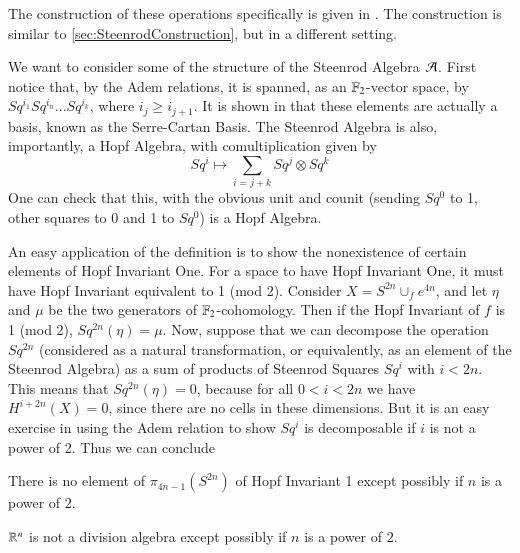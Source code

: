 The construction of these operations specifically is given in \cite[Ch~2]{MosherTengora}.  
The construction is similar to \ref{sec:SteenrodConstruction}, but in a different setting.  

We want to consider some of the structure of the Steenrod Algebra $\mathcal{A}$.  
First notice that, by the Adem relations, it is spanned, as an $\mathbb{F}_2$-vector space, by $Sq^{i_1}Sq^{i_n}...Sq^{i_k}$, where $i_j\ge i_{j+1}$.  
It is shown in \cite[Ch~6]{MosherTengora} that these elements are actually a basis, known as the Serre-Cartan Basis.  
The Steenrod Algebra is also, importantly, a Hopf Algebra, with comultiplication given by
\[Sq^i\mapsto \sum_{i=j+k} Sq^j\otimes Sq^k\]
One can check that this, with the obvious unit and counit (sending $Sq^0$ to 1, other squares to 0 and 1 to $Sq^0$) is a Hopf Algebra.  

An easy application of the definition is to show the nonexistence of certain elements of Hopf Invariant One.
For a space to have Hopf Invariant One, it must have Hopf Invariant equivalent to 1 (mod 2).  
Consider $X=S^{2n}\cup_f e^{4n}$, and let $\eta$ and $\mu$ be the two generators of $\mathbb{F}_2$-cohomology.  
Then if the Hopf Invariant of $f$ is 1 (mod 2), $Sq^{2n}(\eta)=\mu$.
Now, suppose that we can decompose the operation $Sq^{2n}$ (considered as a natural transformation, or equivalently, as an element of the Steenrod Algebra) as a sum of products of Steenrod Squares $Sq^i$ with $i<2n$.  
This means that $Sq^{2n}(\eta)=0$, because for all $0<i<2n$ we have $H^{i+2n}(X)=0$, since there are no cells in these dimensions.  
But it is an easy exercise in using the Adem relation to show $Sq^i$ is decomposable if $i$ is not a power of 2.  
Thus we can conclude
\begin{Cor}
  There is no element of $\pi_{4n-1}(S^{2n})$ of Hopf Invariant 1 except possibly if $n$ is a power of $2$.  
\end{Cor}
\begin{Cor}
  $\mathbb{R}^n$ is not a division algebra except possibly if $n$ is a power of $2$.  
\end{Cor}


